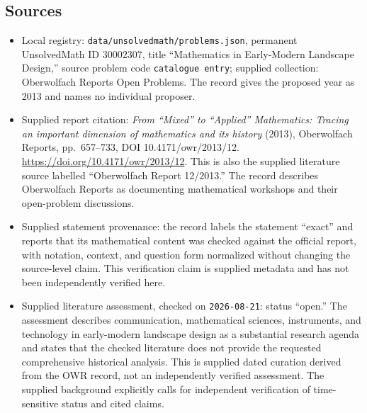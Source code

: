 \documentclass[11pt]{article}
\begin{document}
\subsection{Sources}
\begin{itemize}
\item Local registry: \texttt{data/unsolvedmath/problems.json}, permanent UnsolvedMath ID \(30002307\), title ``Mathematics in Early-Modern Landscape Design,'' source problem code \texttt{catalogue entry}; supplied collection: Oberwolfach Reports Open Problems. The record gives the proposed year as 2013 and names no individual proposer.
\item Supplied report citation: \emph{From ``Mixed'' to ``Applied'' Mathematics: Tracing an important dimension of mathematics and its history} (2013), Oberwolfach Reports, pp.\ 657--733, DOI 10.4171/owr/2013/12. \url{https://doi.org/10.4171/owr/2013/12}. This is also the supplied literature source labelled ``Oberwolfach Report 12/2013.'' The record describes Oberwolfach Reports as documenting mathematical workshops and their open-problem discussions.
\item Supplied statement provenance: the record labels the statement ``exact'' and reports that its mathematical content was checked against the official report, with notation, context, and question form normalized without changing the source-level claim. This verification claim is supplied metadata and has not been independently verified here.
\item Supplied literature assessment, checked on \texttt{2026-08-21}: status ``open.'' The assessment describes communication, mathematical sciences, instruments, and technology in early-modern landscape design as a substantial research agenda and states that the checked literature does not provide the requested comprehensive historical analysis. This is supplied dated curation derived from the OWR record, not an independently verified assessment. The supplied background explicitly calls for independent verification of time-sensitive status and cited claims.
\end{itemize}
\end{document}
